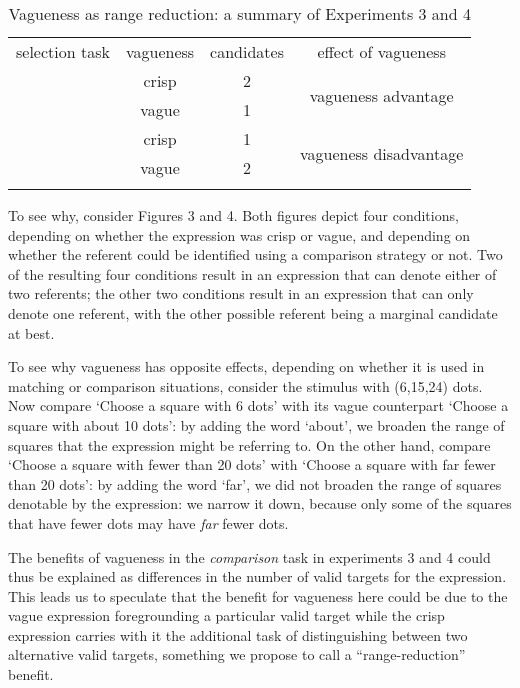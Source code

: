 \begin{table}[htbp]
\caption{Vagueness as range reduction: a summary of Experiments 3 and 4}
\label{Vagueness as range reduction}
\centering
\begin{tabular}{cccc}
\hline\noalign{\smallskip}
selection task 					& vagueness		& candidates	& effect of vagueness						\\
\noalign{\smallskip}\hline\noalign{\smallskip}
\multirow{ 2}{*}{comparison} 	& crisp 		& 2				& \multirow{ 2}{*}{vagueness advantage}  	\\
\cline{2-3}
								& vague			& 1				&                                           \\
\noalign{\smallskip}\hline\noalign{\smallskip}
\multirow{ 2}{*}{matching} 		& crisp 		& 1 			& \multirow{ 2}{*}{vagueness disadvantage}	\\
\cline{2-3}
								& vague			& 2				&								 			\\
\noalign{\smallskip}\hline
\end{tabular}
\end{table}

To see why, consider Figures 3 and 4. Both figures depict four conditions, depending on whether the expression was crisp or vague, and depending on whether the referent could be identified using a comparison strategy or not. Two of the resulting four conditions result in an expression that can denote either of two referents; the other two conditions result in an expression that can only denote one referent, with the other possible referent being a marginal candidate at best.

To see why vagueness has opposite effects, depending on whether it is used in matching or comparison situations, consider the stimulus with (6,15,24) dots. Now compare `Choose a square with 6 dots' with its vague counterpart `Choose a square with about 10 dots': by adding the word `about', we broaden the range of squares that the expression might be referring to. On the other hand, compare `Choose a square with fewer than 20 dots' with `Choose a square with far fewer than 20 dots': by adding the word `far', we did not broaden the range of squares denotable by the expression: we narrow it down, because only some of the squares that have fewer dots may have {\em far} fewer dots.

The benefits of vagueness in the \emph{comparison} task in experiments 3 and 4 could thus be explained as differences in the number of valid targets for the expression. This leads us to speculate that the benefit for vagueness here could be due to the vague expression foregrounding a particular valid target while the crisp expression carries with it the additional task of distinguishing between two alternative valid targets, something we propose to call a ``range-reduction'' benefit.

